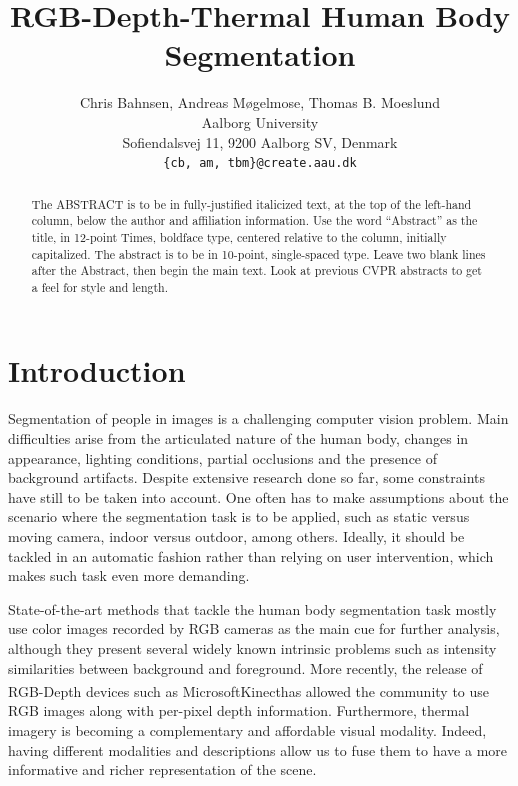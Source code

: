 \documentclass[10pt,twocolumn,letterpaper]{article}
\begin{document}
\title{RGB-Depth-Thermal Human Body Segmentation}

\author{Chris Bahnsen, Andreas Møgelmose, Thomas B. Moeslund\\
Aalborg University\\
Sofiendalsvej 11, 9200 Aalborg SV, Denmark\\
{\tt\small \{cb, am, tbm\}@create.aau.dk}
}

\maketitle

\begin{abstract}
   The ABSTRACT is to be in fully-justified italicized text, at the top
   of the left-hand column, below the author and affiliation
   information. Use the word ``Abstract'' as the title, in 12-point
   Times, boldface type, centered relative to the column, initially
   capitalized. The abstract is to be in 10-point, single-spaced type.
   Leave two blank lines after the Abstract, then begin the main text.
   Look at previous CVPR abstracts to get a feel for style and length.
\end{abstract}

\section{Introduction}
\label{sec:introduction}
Segmentation of people in images is a challenging computer vision problem. Main difficulties arise from the articulated nature of the human body, changes in appearance, lighting conditions, partial occlusions and the presence of background artifacts. Despite extensive research done so far, some constraints have still to be taken into account. One often has to make assumptions about the scenario where the segmentation task is to be applied, such as static versus moving camera, indoor versus outdoor, among others. Ideally, it should be tackled in an automatic fashion rather than relying on user intervention, which makes such task even more demanding. 

State-of-the-art methods that tackle the human body segmentation task mostly use color images recorded by RGB cameras as the main cue for further analysis, although they present several widely known intrinsic problems such as intensity similarities between background and foreground. More recently, the release of RGB-Depth devices such as Microsoft\textsuperscript\textregistered Kinect\textsuperscript\texttrademark has allowed the community to use RGB images along with per-pixel depth information. Furthermore, thermal imagery is becoming a complementary and affordable visual modality. Indeed, having different modalities and descriptions allow us to fuse them to have a more informative and richer representation of the scene. 
\end{document}
